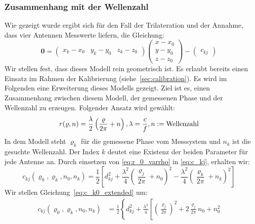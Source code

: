 {
\subsubsection{Zusammenhang mit der Wellenzahl}
Wie gezeigt wurde ergibt sich für den Fall der Trilateration und der Annahme, dass vier Antennen Messwerte liefern, die Gleichung:
\begin{equation}\label{eq:final_trilateration_model}
\mathbf{0}=
\left(
	\begin{array}{ccc}
		x_k-x_0 & y_k-y_0 & z_k-z_0 
	\end{array}
\right)
\left(
   \begin{array}{c}
	   x-x_0\\
	   y-y_0\\
	   z-z_0
   \end{array}
\right)
-
\left(
	\begin{array}{c}
		c_{kj}
	\end{array}
\right) 
\end{equation}
%
Wir stellen fest, dass dieses Modell rein geometrisch ist. Es erlaubt bereits einen Einsatz im Rahmen der Kalibrierung (siehe~\ref{sec:calibration}). Es wird im Folgenden eine Erweiterung dieses Modells gezeigt. Ziel ist es, einen Zusammenhang zwischen diesem Modell, der gemessenen Phase und der Wellenzahl zu erzeugen. Folgender Ansatz wird gewählt:
%
\begin{equation}
	\label{eq:r_0_varrho} r(\varrho,n)=\frac{\lambda}{2}\left(\frac{\varrho}{2\pi}+n\right),\\\lambda=\frac{c}{f}, n:= \text{Wellenzahl}
\end{equation}
%
In dem Modell steht $\varrho_k$ für die gemessene Phase vom Messsystem und $n_k$ ist die gesuchte Wellenzahl. Der Index $k$ deutet eine Existenz der beiden Parameter für jede Antenne an. Durch einsetzen von \eqref{eq:r_0_varrho} in \eqref{eq:c_kj}, erhalten wir:
%
\begin{equation}\label{eq:c_k0_extended}
	c_{kj}(\varrho_0, \varrho_k, n_0, n_k) =\frac{1}{2}\left[d_{kj}^2+\frac{\lambda^2}{4}\left(\frac{\varrho_j}{2\pi}+n_0\right)^2-\frac{\lambda^2}{4}\left(\frac{\varrho_k}{2\pi}+n_k\right)^2\right]
\end{equation}
%
Wir stellen Gleichung~\eqref{eq:c_k0_extended} um:
\begin{align}
%	
	c_{kj}(\varrho_0, \varrho_k, n_0, n_k) &= \frac{1}{2}\left\{d_{kj}^2+\frac{\lambda^2}{4}\left[\left(\frac{\varrho_j}{2\pi}\right)^2+2\frac{\varrho_j}{2\pi}n_0+n_0^2 \right.\right.\nonumber\\

\end{align}}
